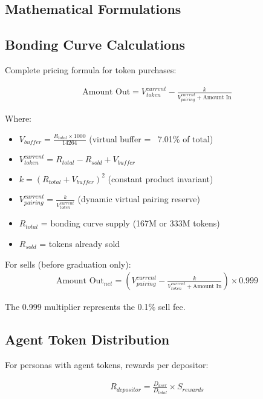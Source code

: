 \documentclass{article}
\begin{document}
\begin{appendices}

\section{Mathematical Formulations}

\subsection{Bonding Curve Calculations}

Complete pricing formula for token purchases:

\begin{align}
\text{Amount Out} = V_{token}^{current} - \frac{k}{V_{pairing}^{current} + \text{Amount In}}
\end{align}

Where:
\begin{itemize}
    \item $V_{buffer} = \frac{R_{total} \times 1000}{14264}$ (virtual buffer = ~7.01\% of total)
    \item $V_{token}^{current} = R_{total} - R_{sold} + V_{buffer}$
    \item $k = (R_{total} + V_{buffer})^2$ (constant product invariant)
    \item $V_{pairing}^{current} = \frac{k}{V_{token}^{current}}$ (dynamic virtual pairing reserve)
    \item $R_{total}$ = bonding curve supply (167M or 333M tokens)
    \item $R_{sold}$ = tokens already sold
\end{itemize}

For sells (before graduation only):
\begin{align}
\text{Amount Out}_{net} = \left(V_{pairing}^{current} - \frac{k}{V_{token}^{current} + \text{Amount In}}\right) \times 0.999
\end{align}

The 0.999 multiplier represents the 0.1\% sell fee.

\subsection{Agent Token Distribution}

For personas with agent tokens, rewards per depositor:

\begin{align}
R_{depositor} = \frac{D_{user}}{D_{total}} \times S_{rewards}
\end{align}


\end{appendices}
\end{document}
